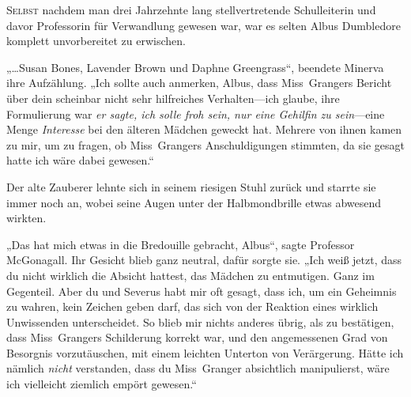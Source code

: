 
\lettrine{S}{elbst} nachdem man drei Jahrzehnte lang stellvertretende Schulleiterin und davor Professorin für Verwandlung gewesen war, war es selten Albus Dumbledore komplett unvorbereitet zu erwischen.

„…Susan Bones, Lavender Brown und Daphne Greengrass“, beendete Minerva ihre Aufzählung. „Ich sollte auch anmerken, Albus, dass Miss~Grangers Bericht über dein scheinbar nicht sehr hilfreiches Verhalten—ich glaube, ihre Formulierung war \emph{er sagte, ich solle froh sein, nur eine Gehilfin zu sein}—eine Menge \emph{Interesse} bei den älteren Mädchen geweckt hat. Mehrere von ihnen kamen zu mir, um zu fragen, ob Miss~Grangers Anschuldigungen stimmten, da sie gesagt hatte ich wäre dabei gewesen.“

Der alte Zauberer lehnte sich in seinem riesigen Stuhl zurück und starrte sie immer noch an, wobei seine Augen unter der Halbmondbrille etwas abwesend wirkten.

„Das hat mich etwas in die Bredouille gebracht, Albus“, sagte Professor McGonagall. Ihr Gesicht blieb ganz neutral, dafür sorgte sie. „Ich weiß jetzt, dass du nicht wirklich die Absicht hattest, das Mädchen zu entmutigen. Ganz im Gegenteil. Aber du und Severus habt mir oft gesagt, dass ich, um ein Geheimnis zu wahren, kein Zeichen geben darf, das sich von der Reaktion eines wirklich Unwissenden unterscheidet. So blieb mir nichts anderes übrig, als zu bestätigen, dass Miss~Grangers Schilderung korrekt war, und den angemessenen Grad von Besorgnis vorzutäuschen, mit einem leichten Unterton von Verärgerung. Hätte ich nämlich \emph{nicht} verstanden, dass du Miss~Granger absichtlich manipulierst, wäre ich vielleicht ziemlich empört gewesen.“

